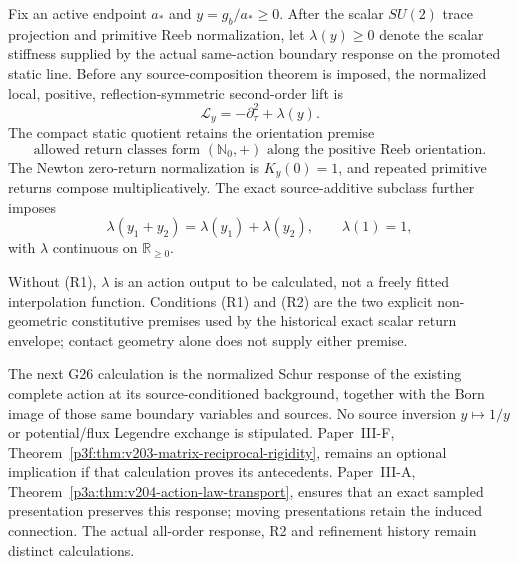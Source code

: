 \documentclass[12pt,a4paper]{article}
\begin{document}
\begin{definition}
\label{p8:def:admissible-scalar-reeb-response-kernel}
Fix an active endpoint \(a_*\) and \(y=g_b/a_*\ge0\).  After the scalar
\(SU(2)\) trace projection and primitive Reeb normalization, let
\(\lambda(y)\ge0\) denote the scalar stiffness supplied by the actual
same-action boundary response on the promoted static line.  Before any
source-composition theorem is imposed, the normalized local, positive,
reflection-symmetric second-order lift is
\[
 \boxed{\mathcal L_y=-\partial_\tau^2+\lambda(y).}
\]
The compact static quotient retains the orientation premise
\begin{equation}
\label{p8:eq:R2-positive-return-monoid}
\tag{R2}
\text{allowed return classes form }(\mathbb N_0,+)\text{ along the positive Reeb orientation}.
\end{equation}
The Newton zero-return normalization is \(K_y(0)=1\), and repeated primitive
returns compose multiplicatively.  The exact source-additive subclass further
imposes
\begin{equation}
\label{p8:eq:R1-source-additivity}
\tag{R1}
\lambda(y_1+y_2)=\lambda(y_1)+\lambda(y_2),
\qquad \lambda(1)=1,
\end{equation}
with \(\lambda\) continuous on \(\mathbb R_{\ge0}\).

Without (R1), \(\lambda\) is an action output to be calculated, not a freely
fitted interpolation function.  Conditions (R1) and (R2) are the two explicit
non-geometric constitutive premises used by the historical exact scalar return
envelope; contact geometry alone does not supply either premise.
\end{definition}


\begin{remark}
\label{p8:rem:v203-born-legendre-target}
The next G26 calculation is the normalized Schur response of the existing
complete action at its source-conditioned background, together with the
Born image of those same boundary variables and sources. No source inversion
$y\mapsto1/y$ or potential/flux Legendre exchange is stipulated.
Paper~III-F, Theorem~\ref{p3f:thm:v203-matrix-reciprocal-rigidity}, remains
an optional implication if that calculation proves its antecedents.
Paper~III-A, Theorem~\ref{p3a:thm:v204-action-law-transport}, ensures that
an exact sampled presentation preserves this response; moving presentations
retain the induced connection. The actual all-order response, R2 and
refinement history remain distinct calculations.
\end{remark}
\end{document}
